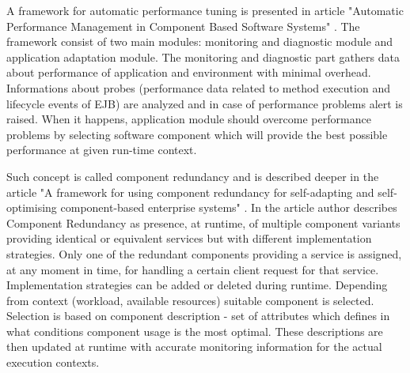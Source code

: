 \documentclass[12pt,a4paper]{article}
\begin{document}
A framework for automatic performance tuning is presented in article "Automatic Performance Management in Component Based Software Systems" \cite{autoframework}. The framework consist of two main modules: monitoring and diagnostic module and application adaptation module. The monitoring and diagnostic part gathers data about performance of application and environment with minimal overhead. Informations about probes (performance data related to method execution and lifecycle
events of EJB) are analyzed and in case of performance problems alert is raised. When it happens, application module should overcome performance problems by selecting software component which will provide the best possible performance at given run-time context. 

Such concept is called component redundancy and is described deeper in the article "A framework for using component redundancy for self-adapting and self-optimising component-based enterprise systems" \cite{redundancycomponent}. In the article author describes Component Redundancy as presence, at runtime, of multiple  component  variants  providing  identical or equivalent services but with different implementation strategies. Only one of the redundant components providing a service is assigned, at any moment in time, for handling a certain client request for that  service.  Implementation strategies can be added or deleted during runtime. Depending from context (workload, available resources) suitable component is selected. Selection is based on component description - set of attributes which defines in what conditions component usage is the most optimal. These descriptions are then updated at runtime with accurate monitoring information for the actual execution contexts. 
\end{document}
